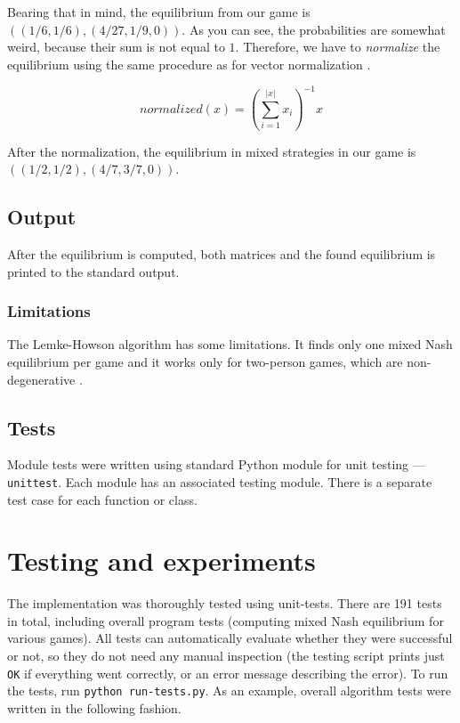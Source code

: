 \documentclass[a4paper,10pt]{article}
\begin{document}
Bearing that in mind, the equilibrium from our game is $((1/6, 1/6), (4/27,
1/9, 0))$. As you can see, the probabilities are somewhat weird, because their
sum is not equal to $1$. Therefore, we have to \emph{normalize} the equilibrium
using the same procedure as for vector normalization \cite{Pritchard08}.

$$normalized(x) = \left(\sum_{i = 1}^{|x|}x_{i}\right)^{-1}x$$

After the normalization, the equilibrium in mixed strategies in our game is
$((1/2, 1/2), (4/7, 3/7, 0))$.

\subsection{Output}

After the equilibrium is computed, both matrices and the found equilibrium is
printed to the standard output.

\subsubsection{Limitations}
\label{sec:Limitations}

The Lemke-Howson algorithm has some limitations. It finds only one mixed Nash
equilibrium per game and it works only for two-person games, which are
non-degenerative \cite{Stengel02, Pritchard08}.

\subsection{Tests}

Module tests were written using standard Python module for unit testing ---
\texttt{unittest}. Each module has an associated testing module. There is a
separate test case for each function or class.

\section{Testing and experiments}
\label{sec:Testing}

The implementation was thoroughly tested using unit-tests. There are 191 tests
in total, including overall program tests (computing mixed Nash equilibrium for
various games). All tests can automatically evaluate whether they were
successful or not, so they do not need any manual inspection (the testing
script prints just \texttt{OK} if everything went correctly, or an error
message describing the error). To run the tests, run \texttt{python
run-tests.py}. As an example, overall algorithm tests were written in the
following fashion.
\end{document}

